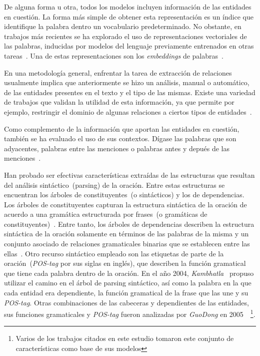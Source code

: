 De alguna forma u otra, todos los modelos incluyen información de las entidades en cuestión.
La forma más simple de obtener esta representación es un índice que identifique la palabra dentro un vocabulario predeterminado.
No obstante, en trabajos más recientes se ha explorado el uso de representaciones vectoriales de las palabras, inducidas por modelos del lenguaje previamente entrenados en otras tareas~\cite{nguyen2014employing}.
Una de estas representaciones son los \textit{embeddings} de palabras~\cite{mikolov_word_embeddings}.

En una metodología general, enfrentar la tarea de extracción de relaciones usualmente implica que anteriormente se hizo un análisis, manual o automático, de las entidades presentes en el texto y el tipo de las mismas. 
Existe una variedad de trabajos que validan la utilidad de esta información, ya que permite por ejemplo, restringir el dominio de algunas relaciones a ciertos tipos de entidades~\cite{kambhatla2004combining, boschee2005automatic, guodong2005exploring, jiang2007systematic, chan2010exploiting}.

Como complemento de la información que aportan las entidades en cuestión, también se ha evaluado el uso de sus contextos.
Dígase las palabras que son adyacentes, palabras entre las menciones o palabras antes y depués de las menciones~\cite{guodong2005exploring, chan2010exploiting, sun2011semi, nguyen2014employing}.

Han probado ser efectivas características extraídas de las estructuras que resultan del análisis sintáctico~(parsing) de la oración.
Entre estas estructuras se encuentran los árboles de constituyentes~(o sintácticos) y los de dependencias.
Los árboles de constituyentes capturan la estructura sintáctica de la oración de acuerdo a una gramática estructurada por frases~(o gramáticas de constituyentes)~\cite{chomsky2002syntactic}.
Entre tanto, los árboles de dependencias describen la estructura sintáctica de la oración solamente en términos de las palabras de la misma y un conjunto asociado de relaciones gramaticales binarias que se establecen entre las ellas~\cite{tesniere2015elements}.
Otro recurso sintáctico empleado son las etiquetas de parte de la oración~(\textit{POS-tag} por sus siglas en inglés), que describen la función gramatical que tiene cada palabra dentro de la oración.
En el año 2004, \textit{Kambhatla}~\cite{kambhatla2004combining} propuso utilizar el camino en el árbol de parsing sintáctico, así como la palabra en la que cada entidad era dependiente, la función gramatical de la frase que las une y su \textit{POS-tag}.
Otras combinaciones de las cabeceras y dependientes de las entidades, sus funciones gramaticales y \textit{POS-tag} fueron analizadas por \textit{GuoDong} en 2005~\cite{guodong2005exploring}~\footnote{Varios de los trabajos citados en este estudio tomaron este conjunto de características como base de sus modelos}.

